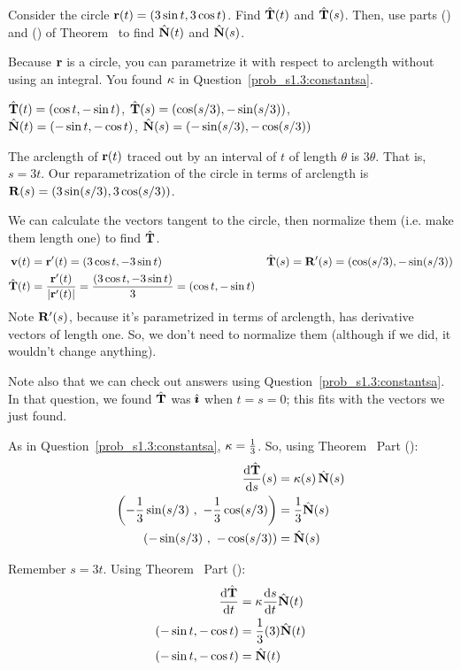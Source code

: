 \begin{question}
Consider the circle $\mathbf{r}(t)=(3\sin t,3\cos t)$. Find $\hat{\mathbf{T}}(t)$ and $\hat{\mathbf{T}}(s)$. Then, use parts () and () of Theorem~ to find $\hat{\mathbf{N}}(t)$ and $\hat{\mathbf{N}}(s)$.
\end{question}
\begin{hint}
Because $\mathbf{r}$ is a circle, you can parametrize it with respect to arclength without using an integral. You found $\kappa$ in  Question~\ref{prob_s1.3:constantsa}.
\end{hint}
\begin{answer}
$\hat{\mathbf{T}}(t)=(\cos t, -\sin t) $, $\hat{\mathbf{T}}(s)=(\cos(s/3),-\sin(s/3))$,\\
$\hat{\mathbf{N}}(t)=(-\sin t ,-\cos t)$, $\hat{\mathbf{N}}(s)=\left(-\sin(s/3),-\cos(s/3) \right)$
\end{answer}
\begin{solution}
The arclength of $\mathbf{r}(t)$ traced out by an interval of $t$ of length $\theta$ is $3\theta$. That is, $s=3t$. Our reparametrization of the circle in terms of arclength is $\mathbf{R}(s)=(3\sin(s/3),3\cos(s/3))$.

We can calculate the vectors tangent to the circle, then normalize them (i.e. make them length one) to find $\hat{\mathbf{T}}$.
\begin{align*}
\mathbf{v}(t)&=\mathbf{r}'(t)=(3\cos t, -3\sin t) & \hat{\mathbf{T}}(s)&=\mathbf{R}'(s)=(\cos(s/3),-\sin(s/3))\\
\hat{\mathbf{T}}(t)&=\frac{\mathbf{r}'(t)}{|\mathbf{r}'(t)|}=\frac{(3\cos t, -3\sin t)}{3}=(\cos t, -\sin t) 
\end{align*}
Note $\mathbf{R}'(s)$, because it's parametrized in terms of arclength, has derivative vectors of length one. So, we don't need to normalize them (although if we did, it wouldn't change anything).

Note also that we can check out answers using Question~\ref{prob_s1.3:constantsa}. In that question, we found $\hat{\mathbf{T}}$ was $\hat{\pmb{\imath}}$ when $t=s=0$; this fits with the vectors we just found.

As in Question~\ref{prob_s1.3:constantsa}, $\kappa=\frac13$. So, using Theorem~ Part ():
\begin{align*}
\diff{\hT}{s}(s) &= \ka(s)\,\hN(s)\\
\left(-\frac13\sin(s/3)~,~-\frac13\cos(s/3) \right)&=\frac13\hN(s)\\
\left(-\sin(s/3)~,~-\cos(s/3) \right)&=\hN(s)
\end{align*}

Remember $s=3t$. Using Theorem~ Part ():
\begin{align*}
\diff{\hT}{t} &= \ka \diff{s}{t} \hN(t)\\
(-\sin t ,-\cos t) &= \frac13 (3) \hN(t)\\
(-\sin t ,-\cos t) &= \hN(t)
\end{align*}
\end{solution}
